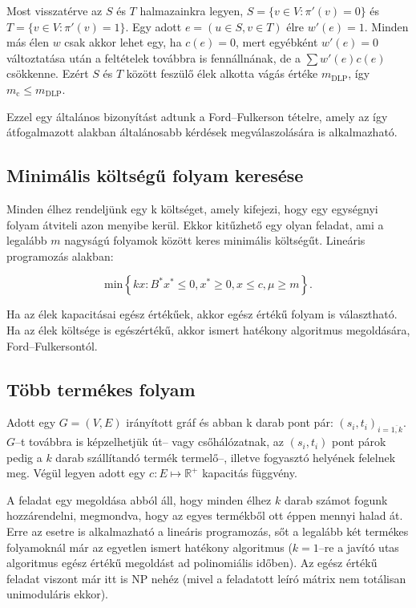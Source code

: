 Most visszatérve az $S$ és $T$ halmazainkra legyen, $S=\{v \in V: \pi'(v)=0\} $
és $T=\{v \in V: \pi'(v)=1\}$. Egy adott $e=(u \in S, v \in T)$ élre $w'(e)=1$.
Minden más élen $w$ csak akkor lehet egy, ha $c(e)=0$, mert egyébként $w'(e)=0$
változtatása után a feltételek továbbra is fennállnának, de a $\sum w'(e)c(e)$
csökkenne. Ezért $S$ és $T$ között feszülő élek alkotta vágás értéke
$m_{\mbox{DLP}}$, így $m_{\mbox{c}} \leq m_{\mbox{DLP}}$.

Ezzel egy általános bizonyítást adtunk a Ford--Fulkerson tételre, amely az így
átfogalmazott alakban általánosabb kérdések megválaszolására is alkalmazható.

\subsection{Minimális költségű folyam keresése}

Minden élhez rendeljünk egy k költséget, amely kifejezi, hogy egy egységnyi folyam
átviteli azon menyibe kerül. Ekkor kitűzhető egy olyan feladat, ami a legalább $m$
nagyságú folyamok között keres minimális költségűt. Lineáris programozás alakban:

\[ \mbox{min} \left\{kx: B^*x^* \leq 0, x^* \geq 0, x \leq c,\mu \geq m \right\}. \]

Ha az élek kapacitásai egész értékűek, akkor egész értékű folyam is választható.
Ha az élek költsége is egészértékű, akkor ismert hatékony algoritmus megoldására,
Ford--Fulkersontól.

\subsection{Több termékes folyam}

Adott egy $G=(V,E)$ irányított gráf és abban k darab pont pár:
$(s_i,t_i)_{i = \overline{1,k}}$. $G$--t továbbra is képzelhetjük út-- vagy
csőhálózatnak, az $(s_i, t_i)$ pont párok pedig a $k$ darab szállítandó termék
termelő--, illetve fogyasztó helyének felelnek meg. Végül legyen adott egy $c:E
\mapsto \mathbb{R}^+$ kapacitás függvény.

A feladat egy megoldása abból áll, hogy minden élhez $k$ darab számot fogunk
hozzárendelni, megmondva, hogy az egyes termékből ott éppen mennyi halad át.
Erre az esetre is alkalmazható a lineáris programozás, sőt a legalább két
termékes folyamoknál már az egyetlen ismert hatékony algoritmus ($k=1$--re a
javító utas algoritmus egész értékű megoldást ad polinomiális időben). Az egész
értékű feladat viszont már itt is NP nehéz (mivel a feladatott leíró mátrix nem
totálisan unimoduláris ekkor).